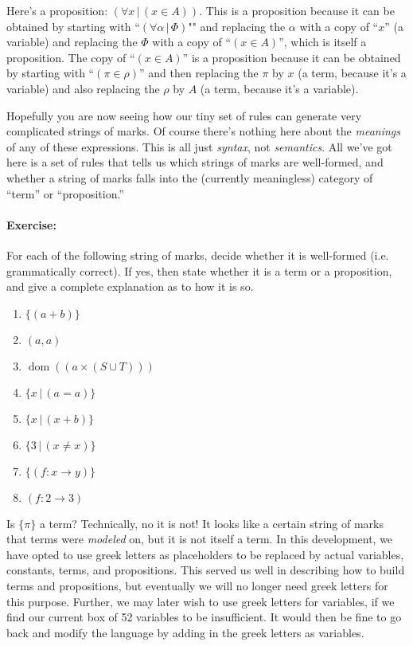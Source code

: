 \documentclass[12pt]{article}
\newcommand{\dom}[1]{\operatorname{dom}(#1)}
\newcommand{\ex}[1]{\paragraph{Exercise:}#1}
\begin{document}
Here's a proposition: $(\forall x\,|\, (x\in A))$.
This is a proposition because it can be obtained by starting with
``$(\forall\alpha\,|\,\Phi)$"" and replacing the $\alpha$ with a copy of ``$x$'' (a variable)
and replacing the $\Phi$ with a copy of ``$(x\in A)$'', which is itself a proposition.
The copy of ``$(x\in A)$'' is a proposition because it can be obtained by
starting with ``$(\pi\in\rho)$'' and then replacing the $\pi$ by $x$ (a term, because it's a variable)
and also replacing the $\rho$ by $A$ (a term, because it's a variable).

Hopefully you are now seeing how our tiny set of rules can generate very complicated strings of marks.
Of course there's nothing here about the \emph{meanings} of any of these expressions.
This is all just \emph{syntax}, not \emph{semantics}.
All we've got here is a set of rules that tells us which strings of marks are well-formed,
and whether a string of marks falls into the (currently meaningless) category of ``term'' or ``proposition.''

\ex{
For each of the following string of marks, decide whether it is well-formed (i.e. grammatically correct). 
If yes, then state whether it is a term or a proposition, and give a complete explanation as to how it is so.
\begin{enumerate}
\item $\{(a + b)\}$
\item $(a,a)$
\item $\dom{(a\times(S\cup T))}$
\item $\{x\,|\,(a=a)\}$
\item $\{x\,|\,(x+b)\}$
\item $\{3\,|\,(x\neq x)\}$
\item $\{(f:x\rightarrow y)\}$
\item $(f:2\rightarrow 3)$
\end{enumerate}
}

Is $\{\pi\}$ a term?
Technically, no it is not! It looks like a certain string of marks that terms were \emph{modeled} on, but
it is not itself a term.
In this development, we have opted to use greek letters as placeholders to be replaced by actual variables, constants, terms, and propositions.
This served us well in describing how to build terms and propositions, but eventually we will no longer need greek letters for this purpose.
Further, we may later wish to use greek letters for variables, if we find our current box of 52 variables to be insufficient.
It would then be fine to go back and modify the language by adding in the greek letters as variables.
\end{document}
